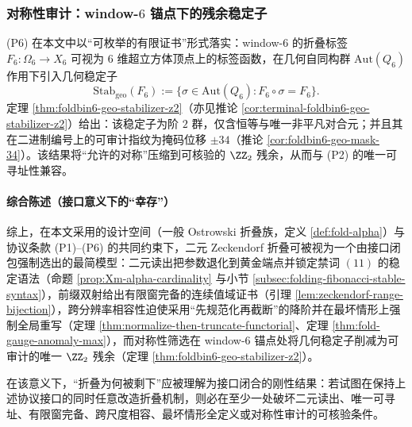 \subsubsection{对称性审计：window-\texorpdfstring{$6$}{6} 锚点下的残余稳定子}
(P6) 在本文中以“可枚举的有限证书”形式落实：window-\(6\) 的折叠标签 \(F_6:\Omega_6\to X_6\) 可视为 \(6\) 维超立方体顶点上的标签函数，在几何自同构群 \(\mathrm{Aut}(Q_6)\) 作用下引入几何稳定子
\[
\mathrm{Stab}_{\mathrm{geo}}(F_6):=\{\sigma\in\mathrm{Aut}(Q_6):F_6\circ\sigma=F_6\}.
\]
定理 \ref{thm:foldbin6-geo-stabilizer-z2}（亦见推论 \ref{cor:terminal-foldbin6-geo-stabilizer-z2}）给出：该稳定子为阶 \(2\) 群，仅含恒等与唯一非平凡对合元；并且其在二进制编号上的可审计指纹为掩码位移 \(\pm 34\)（推论 \ref{cor:foldbin6-geo-mask-34}）。该结果将“允许的对称”压缩到可核验的 \(\ZZ_2\) 残余，从而与 (P2) 的唯一可寻址性兼容。

\paragraph{综合陈述（接口意义下的“幸存”）}
综上，在本文采用的设计空间（一般 Ostrowski 折叠族，定义 \ref{def:fold-alpha}）与协议条款 (P1)--(P6) 的共同约束下，二元 Zeckendorf 折叠可被视为一个由接口闭包强制选出的最简模型：二元读出把参数退化到黄金端点并锁定禁词 \((11)\) 的稳定语法（命题 \ref{prop:Xm-alpha-cardinality} 与小节 \ref{subsec:folding-fibonacci-stable-syntax}），前缀双射给出有限窗完备的连续值域证书（引理 \ref{lem:zeckendorf-range-bijection}），跨分辨率相容性迫使采用“先规范化再截断”的降阶并在最坏情形上强制全局重写（定理 \ref{thm:normalize-then-truncate-functorial}、定理 \ref{thm:fold-gauge-anomaly-max}），而对称性筛选在 window-\(6\) 锚点处将几何稳定子削减为可审计的唯一 \(\ZZ_2\) 残余（定理 \ref{thm:foldbin6-geo-stabilizer-z2}）。\par
在该意义下，“折叠为何被剩下”应被理解为接口闭合的刚性结果：若试图在保持上述协议接口的同时任意改造折叠机制，则必在至少一处破坏二元读出、唯一可寻址、有限窗完备、跨尺度相容、最坏情形全定义或对称性审计的可核验条件。

